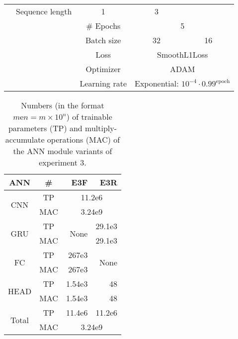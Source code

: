 \begin{table}[h]
\begin{tabular}{|c|c|c|c|p{\wcols}|p{\wcols}|}
        &\multicolumn{2}{c|}{Sequence length}
        &\multicolumn{1}{c|}{1}
        &\multicolumn{1}{c|}{3}
        \\\cline{3-\ncols}
        &
        &\multicolumn{2}{c|}{\# Epochs}
        &\multicolumn{2}{c|}{5}
        \\\cline{3-\ncols}
        &
        &\multicolumn{2}{c|}{Batch size}
        &\multicolumn{1}{c|}{32}
        &\multicolumn{1}{c|}{16}
        \\\cline{3-\ncols}
        &
        &\multicolumn{2}{c|}{Loss}
        &\multicolumn{2}{c|}{SmoothL1Loss}
        \\\cline{3-\ncols}
        &
        &\multicolumn{2}{c|}{Optimizer}
        &\multicolumn{2}{c|}{ADAM}
        \\\cline{3-\ncols}
        &
        &\multicolumn{2}{c|}{Learning rate}
        &\multicolumn{2}{c|}{Exponential: $10^{-4}\cdot 0.99^\text{epoch}$}
        \\\hline
    \end{tabular}
\end{table}


\providecommand{\ncols}{}\renewcommand{\ncols}{4}
\begin{table}[h]
    \caption[
        Trainable parameters and MAC operations of experiment 3
    ]{
        Numbers (in the format $m\text{e}n = m\times 10^n$) of trainable parameters (TP)
        and multiply-accumulate operations (MAC)
        of the ANN module variants of experiment 3.
        \label{tab:exp3_nums}}        
    \centering
    \begin{tabular}{|c|c|r|r|} 
        \hline
        ANN
        &\#
        &E3F
        &E3R
        \\\hline
        \multirow{2}{*}{CNN}
        &TP
        &\multicolumn{2}{c|}{11.2e6}
        \\\cline{2-\ncols}
        &MAC
        &\multicolumn{2}{c|}{3.24e9}
        \\\hline
        \multirow{2}{*}{GRU}
        &TP
        &\multirow{2}{*}{None}
        &29.1e3
        \\\cline{2-2}\cline{4-\ncols}
        &MAC
        &
        &29.1e3
        \\\hline
        \multirow{2}{*}{FC}
        &TP
        &267e3
        &\multirow{2}{*}{None}
        \\\cline{2-3}
        &MAC
        &267e3
        &
        \\\hline
        \multirow{2}{*}{HEAD}
        &TP
        &1.54e3
        &48
        \\\cline{2-\ncols}
        &MAC
        &1.54e3
        &48
        \\\hline
        \multirow{2}{*}{Total}
        &TP
        &11.4e6
        &11.2e6
        \\\cline{2-\ncols}
        &MAC
        &\multicolumn{2}{c|}{3.24e9}
        \\\hline
    \end{tabular}
\end{table}

